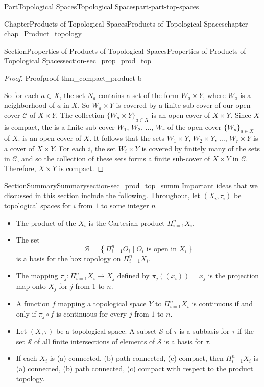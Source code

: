 \documentclass[oneside,10pt,]{book}
\numberwithin{equation}{chapter}
\newcommand{\CS}{\mathcal{S}}
\newcommand{\CC}{\mathcal{C}}
\newcommand{\CB}{\mathcal{B}}
\begin{document}
\begin{partptx}{Part}{Topological Spaces}{}{Topological Spaces}{}{}{part-part-top-spaces}
\begin{chapterptx}{Chapter}{Products of Topological Spaces}{}{Products of Topological Spaces}{}{}{chapter-chap_Product_topology}
\begin{sectionptx}{Section}{Properties of Products of Topological Spaces}{}{Properties of Products of Topological Spaces}{}{}{section-sec_prop_prod_top}
\begin{proof}{Proof}{}{proof-thm_compact_product-b}
\par
So for each \(a \in X\), the set \(N_a\) contains a set of the form \(W_a \times Y\), where \(W_a\) is a neighborhood of \(a\) in \(X\). So \(W_a \times Y\) is covered by a finite sub-cover of our open cover \(\CC\) of \(X \times Y\). The collection \(\{W_a \times Y\}_{a \in X}\) is an open cover of \(X \times Y\). Since \(X\) is compact, the is a finite sub-cover \(W_1\), \(W_2\), \(\ldots\), \(W_r\) of the open cover \(\{W_a\}_{a \in X}\) of \(X\). is an open cover of \(X\). It follows that the sets \(W_1 \times Y\), \(W_2 \times Y\), \(\ldots\), \(W_r \times Y\) is a cover of \(X \times Y\). For each \(i\), the set \(W_i \times Y\) is covered by finitely many of the sets in \(\CC\), and so the collection of these sets forms a finite sub-cover of \(X \times Y\) in \(\CC\). Therefore, \(X \times Y\) is compact.%
\end{proof}
\end{sectionptx}
%
%
\typeout{************************************************}
\typeout{************************************************}
%
\begin{sectionptx}{Section}{Summary}{}{Summary}{}{}{section-sec_prod_top_summ}
Important ideas that we discussed in this section include the following. Throughout, let \((X_i, \tau_i)\) be topological spaces for \(i\) from \(1\) to some integer \(n\)%
\begin{itemize}[label=\textbullet]
\item{}The product of the \(X_i\) is the Cartesian product \(\Pi_{i=1}^n X_i\).%
\item{}The set%
\begin{equation*}
\CB = \left\{ \Pi_{i=1}^n O_i \mid O_i \text{ is open in }  X_i\right\}
\end{equation*}
is a basis for the box topology on \(\Pi_{i=1}^n X_i\).%
\item{}The mapping \(\pi_j : \Pi_{i=1}^n X_i \to X_j\) defined by \(\pi_j((x_i)) = x_j\) is the projection map onto \(X_j\) for \(j\) from 1 to \(n\).%
\item{}A function \(f\) mapping a topological space \(Y\) to \(\Pi_{i=1}^n X_i\) is continuous if and only if \(\pi_j \circ f\) is continuous for every \(j\) from \(1\) to \(n\).%
\item{}Let \((X, \tau)\) be a topological space. A subset \(\CS\) of \(\tau\) is a subbasis for \(\tau\) if the set \(\CS\) of all finite intersections of elements of \(\CS\) is a basis for \(\tau\).%
\item{}If each \(X_i\) is (a) connected, (b) path connected, (c) compact, then \(\Pi_{i=1}^n X_i\) is (a) connected, (b) path connected, (c) compact with respect to the product topology.%

\end{itemize}
\end{sectionptx}
\end{chapterptx}
\end{partptx}
\end{document}
